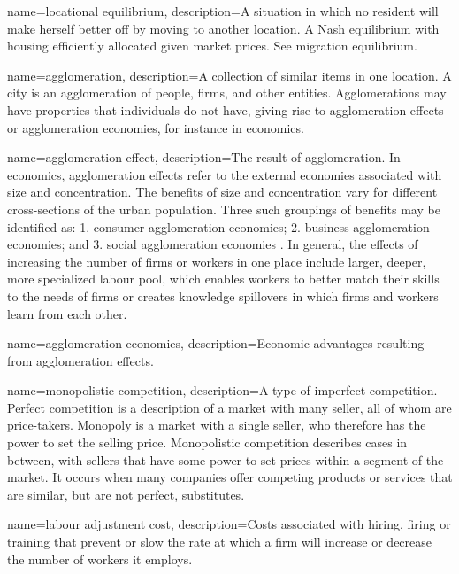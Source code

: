 {
name=locational equilibrium,
description={A situation in which no resident will make herself better off by moving to another location. A Nash equilibrium with housing efficiently allocated  given market prices. See \gls{migration equilibrium}.}
}

{
name=agglomeration,
description={A collection of similar items in one location. A city is an agglomeration of people, firms, and other entities. Agglomerations may have properties that individuals do not have, giving rise to \glspl{agglomeration effect} or \gls{agglomeration economies}, for instance in economics.}
}

{
name=agglomeration effect,
description={The result of \gls{agglomeration}. In economics, \glspl{agglomeration effect} refer to the external economies associated with size and concentration. The benefits of size and concentration vary for different cross-sections of the urban population. Three such groupings of benefits may be identified as: 1. consumer agglomeration economies; 2. business agglomeration economies; and 3. social agglomeration economies \cite{carlinoAgglomerationEconomiesSurvey1978}. In general, the effects of increasing the number of firms or workers in one place include larger, deeper, more specialized labour pool, which enables workers to better match their skills to the needs of firms or creates knowledge spillovers in which firms and workers learn from each other.}
}

{
name=agglomeration economies,
description={Economic advantages %
resulting from \glspl{agglomeration effect}.}
}

{
name=monopolistic competition,
description={A type of  \gls{imperfect competition}. \gls{Perfect competition} is a description of a market with many seller, all of whom are price-takers. Monopoly is a market with a single seller, who therefore has the power to set the selling price. Monopolistic competition describes cases in between, with sellers that have some power to set prices within a segment of the market. It occurs when many companies offer competing products or services that are similar, but are not perfect, substitutes.}
}

{
name=labour adjustment cost,
description={Costs associated with hiring, firing or training that prevent or slow the rate at which a firm will increase or decrease the number of workers it employs.}
}

